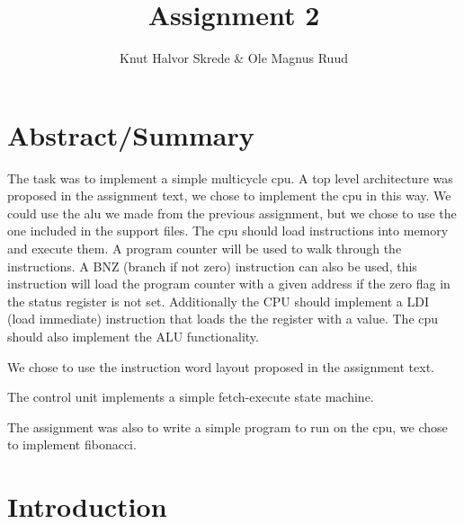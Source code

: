 \documentclass[10pt]{report}
\title{Assignment 2}
\author{Knut Halvor Skrede \& Ole Magnus Ruud}
\begin{document}
	\maketitle
	\clearpage


	\section*{Abstract/Summary}


	The task was to implement a simple multicycle cpu. A top level architecture was proposed in the assignment text, we chose to implement the cpu in this way. We could use the alu we made from the previous assignment, but we chose to use the one included in the support files. The cpu should load instructions into memory and execute them. A program counter will be used to walk through the instructions. A BNZ (branch if not zero) instruction can also be used, this instruction will load the program counter with a given address if the zero flag in the status register is not set. Additionally the CPU should implement a LDI (load immediate) instruction that loads the the register with a value. The cpu should also implement the ALU functionality.

We chose to use the instruction word layout proposed in the assignment text.

The control unit implements a simple fetch-execute state machine.

The assignment was also to write a simple program to run on the cpu, we chose to implement fibonacci.

	\section*{Introduction}

\end{document}
